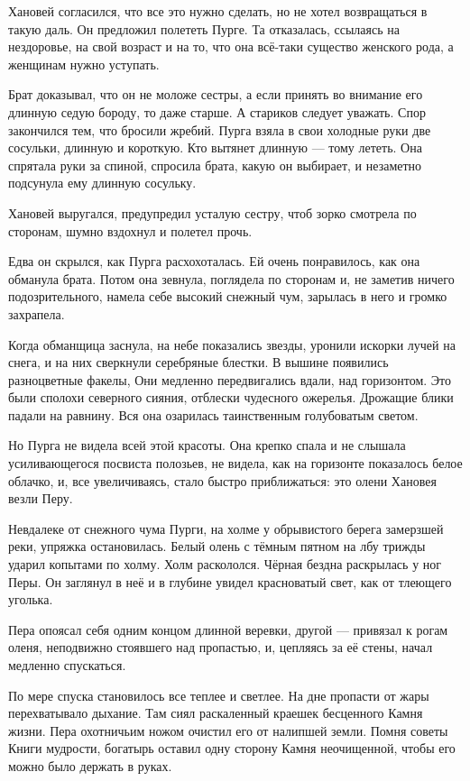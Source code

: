 \documentclass[12pt, a4paper, openany]{book}
\begin{document}
	Хановей согласился, что все это нужно сделать, но не хотел возвращаться в такую даль. Он предложил полететь Пурге. Та отказалась, ссылаясь на нездоровье, на свой возраст и на то, что она всё-таки существо женского рода, а женщинам нужно уступать.
	
	Брат доказывал, что он не моложе сестры, а если принять во внимание его длинную седую бороду, то даже старше. А стариков следует уважать. Спор закончился тем, что бросили жребий. Пурга взяла в свои холодные руки две сосульки, длинную и короткую. Кто вытянет длинную — тому лететь. Она спрятала руки за спиной, спросила брата, какую он выбирает, и незаметно подсунула ему длинную сосульку.
	
	Хановей выругался, предупредил усталую сестру, чтоб зорко смотрела по сторонам, шумно вздохнул и полетел прочь.
	
	Едва он скрылся, как Пурга расхохоталась. Ей очень понравилось, как она обманула брата. Потом она зевнула, поглядела по сторонам и, не заметив ничего подозрительного, намела себе высокий снежный чум, зарылась в него и громко захрапела.
	
	Когда обманщица заснула, на небе показались звезды, уронили искорки лучей на снега, и на них сверкнули серебряные блестки. В вышине появились разноцветные факелы, Они медленно передвигались вдали, над горизонтом. Это были сполохи северного сияния, отблески чудесного ожерелья. Дрожащие блики падали на равнину. Вся она озарилась таинственным голубоватым светом.
	
	Но Пурга не видела всей этой красоты. Она крепко спала и не слышала усиливающегося посвиста полозьев, не видела, как на горизонте показалось белое облачко, и, все увеличиваясь, стало быстро приближаться: это олени Хановея везли Перу.
	
	Невдалеке от снежного чума Пурги, на холме у обрывистого берега замерзшей реки, упряжка остановилась. Белый олень с тёмным пятном на лбу трижды ударил копытами по холму. Холм раскололся. Чёрная бездна раскрылась у ног Перы. Он заглянул в неё и в глубине увидел красноватый свет, как от тлеющего уголька.
	
	Пера опоясал себя одним концом длинной веревки, другой — привязал к рогам оленя, неподвижно стоявшего над пропастью, и, цепляясь за её стены, начал медленно спускаться.
	
	По мере спуска становилось все теплее и светлее. На дне пропасти от жары перехватывало дыхание. Там сиял раскаленный краешек бесценного Камня жизни. Пера охотничьим ножом очистил его от налипшей земли. Помня советы Книги мудрости, богатырь оставил одну сторону Камня неочищенной, чтобы его можно было держать в руках.
	
\end{document}
